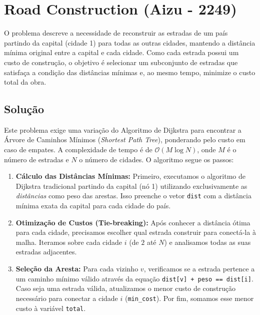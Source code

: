 \documentclass[12pt,a4paper]{article}
\begin{document}
\newpage

\section{Road Construction (Aizu - 2249)}
O problema descreve a necessidade de reconstruir as estradas de um país partindo da capital (cidade 1) para todas as outras cidades, mantendo a distância mínima original entre a capital e cada cidade. Como cada estrada possui um custo de construção, o objetivo é selecionar um subconjunto de estradas que satisfaça a condição das distâncias mínimas e, ao mesmo tempo, minimize o custo total da obra.

\subsection{Solução}
Este problema exige uma variação do Algoritmo de Dijkstra para encontrar a Árvore de Caminhos Mínimos (\textit{Shortest Path Tree}), ponderando pelo custo em caso de empates. A complexidade de tempo é de $\mathcal{O}(M \log N)$, onde $M$ é o número de estradas e $N$ o número de cidades. O algoritmo segue os passos:

\begin{enumerate}
    \item \textbf{Cálculo das Distâncias Mínimas:} Primeiro, executamos o algoritmo de Dijkstra tradicional partindo da capital (nó 1) utilizando exclusivamente as \textit{distâncias} como peso das arestas. Isso preenche o vetor \texttt{dist} com a distância mínima exata da capital para cada cidade do país.
    \item \textbf{Otimização de Custos (Tie-breaking):} Após conhecer a distância ótima para cada cidade, precisamos escolher qual estrada construir para conectá-la à malha. Iteramos sobre cada cidade $i$ (de $2$ até $N$) e analisamos todas as suas estradas adjacentes.
    \item \textbf{Seleção da Aresta:} Para cada vizinho $v$, verificamos se a estrada pertence a um caminho mínimo válido através da equação \texttt{dist[v] + peso == dist[i]}. Caso seja uma estrada válida, atualizamos o menor custo de construção necessário para conectar a cidade $i$ (\texttt{min\_cost}). Por fim, somamos esse menor custo à variável \texttt{total}.
\end{enumerate}
\end{document}
